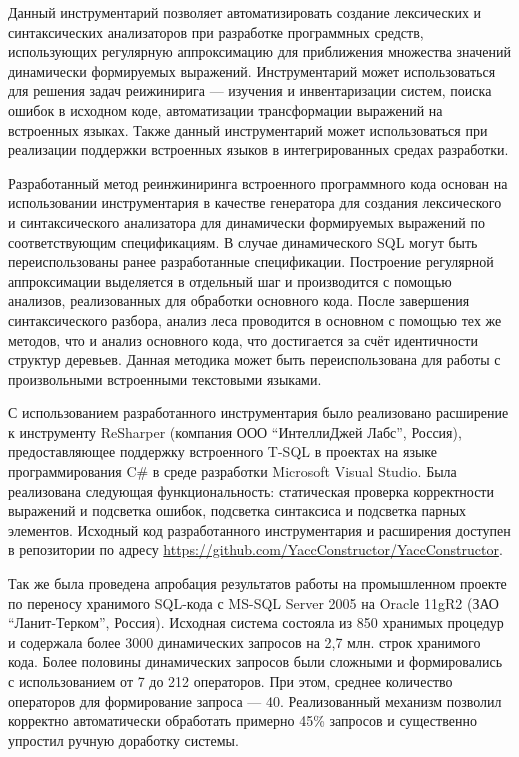 Данный инструментарий позволяет автоматизировать создание лексических и синтаксических анализаторов при разработке программных средств, использующих регулярную аппроксимацию для приближения множества значений динамически формируемых выражений. Инструментарий может использоваться  для решения задач реижинирига --- изучения и инвентаризации систем, поиска ошибок в исходном коде, автоматизации трансформации выражений на встроенных языках. Также данный инструментарий может использоваться при реализации поддержки встроенных языков в интегрированных средах разработки.

Разработанный метод реинжиниринга встроенного программного кода основан на использовании инструментария в качестве генератора для создания лексического и синтаксического анализатора для динамически 
формируемых выражений по соответствующим спецификациям. В случае динамического SQL могут быть переиспользованы ранее разработанные спецификации. Построение регулярной аппроксимации выделяется в отдельный 
шаг и производится с помощью анализов, реализованных для обработки основного кода. После завершения синтаксического разбора, анализ леса проводится в основном с помощью тех же методов, что и анализ 
основного кода, что достигается за счёт идентичности структур деревьев. Данная методика может быть переиспользована для работы с произвольными встроенными текстовыми языками.

С использованием разработанного инструментария было реализовано расширение к инструменту ReSharper (компания ООО ``ИнтеллиДжей Лабс'', Россия), предоставляющее поддержку встроенного T-SQL в проектах на языке программирования C\# в среде разработки Microsoft Visual Studio. Была реализована следующая функциональность: статическая проверка корректности выражений и подсветка ошибок, подсветка синтаксиса и подсветка парных элементов. Исходный код разработанного инструментария и расширения доступен в репозитории по адресу \url{https://github.com/YaccConstructor/YaccConstructor}.

Так же была проведена апробация результатов работы на промышленном проекте по переносу хранимого SQL-кода с MS-SQL Server 2005 на Oraclе 11gR2 (ЗАО ``Ланит-Терком'', Россия). Исходная система состояла из 850 хранимых процедур и содержала более 3000 динамических запросов на 2,7 млн. строк хранимого кода. Более половины динамических запросов были сложными и формировались с использованием от 7 до 212 операторов. При этом, среднее количество операторов для формирование запроса ---  40. Реализованный механизм позволил корректно автоматически обработать примерно 45\% запросов и существенно упростил ручную доработку системы. 


